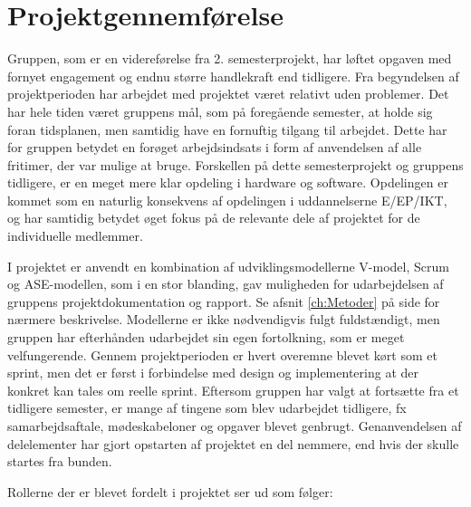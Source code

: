 \section{Projektgennemførelse} \label{ch:Projektgennemfoerelse}

Gruppen, som er en videreførelse fra 2. semesterprojekt, har løftet opgaven med fornyet engagement og endnu større handlekraft end tidligere. Fra begyndelsen af projektperioden har arbejdet med projektet været relativt uden problemer. Det har hele tiden været gruppens mål, som på foregående semester, at holde sig foran tidsplanen\cite{lib:Tidsplan}, men samtidig have en fornuftig tilgang til arbejdet. Dette har for gruppen betydet en forøget arbejdsindsats i form af anvendelsen af alle fritimer, der var mulige at bruge.  
Forskellen på dette semesterprojekt og gruppens tidligere, er en meget mere klar opdeling i hardware og software. Opdelingen er kommet som en naturlig konsekvens af opdelingen i uddannelserne E/EP/IKT, og har samtidig betydet øget fokus på de relevante dele af projektet for de individuelle medlemmer. 

I projektet er anvendt en kombination af udviklingsmodellerne V-model, Scrum og ASE-modellen, som i en stor blanding, gav muligheden for udarbejdelsen af gruppens projektdokumentation og rapport. Se afsnit \ref{ch:Metoder}  på side \pageref{ch:Metoder} for nærmere beskrivelse. Modellerne er ikke nødvendigvis fulgt fuldstændigt, men gruppen har efterhånden udarbejdet sin egen fortolkning, som er meget velfungerende. Gennem projektperioden er hvert overemne blevet kørt som et sprint, men det er  først i forbindelse med design og implementering at der konkret kan tales om reelle sprint. 
Eftersom gruppen har valgt at fortsætte fra et tidligere semester, er mange af tingene som blev udarbejdet tidligere, fx samarbejdsaftale, mødeskabeloner og opgaver blevet genbrugt. Genanvendelsen af delelementer har gjort opstarten af projektet en del nemmere, end hvis der skulle startes fra bunden.

Rollerne der er blevet fordelt i projektet ser ud som følger:

